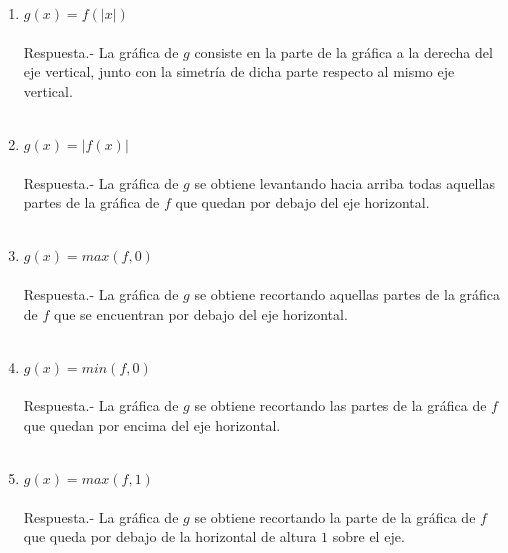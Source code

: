 \begin{enumerate}
\begin{enumerate}[\bfseries (i)]
	\item $g(x)=f(|x|)$\\\\
	    Respuesta.-\; La gráfica de $g$ consiste en la parte de la gráfica a la derecha del eje vertical, junto con la simetría de dicha parte respecto al mismo eje vertical.\\\\

	\item $g(x)=|f(x)|$\\\\
	    Respuesta.-\; La gráfica de $g$ se obtiene levantando hacia arriba todas aquellas partes de la gráfica de $f$ que quedan por debajo del eje horizontal.\\\\

	\item $g(x)=max(f,0)$\\\\
	    Respuesta.-\; La gráfica de $g$ se obtiene recortando aquellas partes de la gráfica de $f$ que se encuentran por debajo del eje horizontal.\\\\ 

	\item $g(x)=min(f,0)$\\\\
	    Respuesta.-\; La gráfica de $g$ se obtiene recortando las partes de la gráfica de $f$ que quedan por encima del eje horizontal.\\\\

	\item $g(x)=max(f,1)$\\\\
	    Respuesta.-\; La gráfica de $g$ se obtiene recortando la parte de la gráfica de $f$ que queda por debajo de la horizontal de altura $1$ sobre el eje.\\\\

    \end{enumerate}


\end{enumerate}
